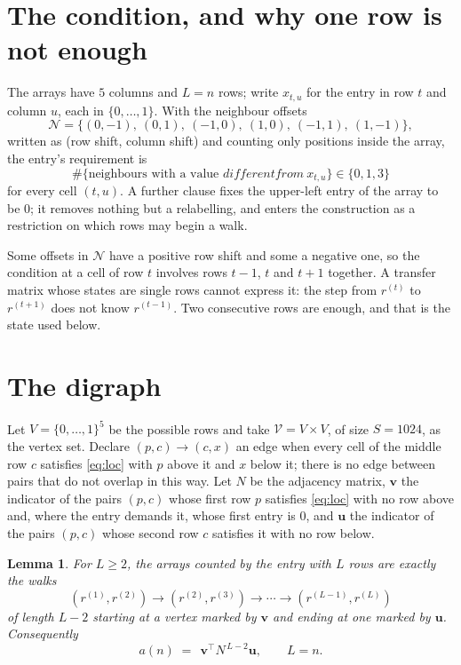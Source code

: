 \documentclass[11pt,a4paper]{article}
\theoremstyle{plain}
\newtheorem{lemma}[theorem]{Lemma}
\theoremstyle{definition}
\begin{document}
\section{The condition, and why one row is not enough}

The arrays have $5$ columns and $L=n$ rows; write $x_{t,u}$ for the entry in
row $t$ and column $u$, each in $\{0,\dots,1\}$. With the neighbour offsets
\[
\mathcal N=\{(0,-1),\ (0,1),\ (-1,0),\ (1,0),\ (-1,1),\ (1,-1)\},
\]
written as (row shift, column shift) and counting only positions inside the array, the
entry's requirement is
\begin{equation}\label{eq:loc}
\#\{\text{neighbours with a value }different from\ x_{t,u}\}\in\{0,1,3\}
\end{equation}
for every cell $(t,u)$. A further clause fixes the upper-left entry of the array to be $0$; it removes nothing but a relabelling, and enters the construction as a restriction on which rows may begin a walk.

Some offsets in $\mathcal N$ have a positive row shift and some a negative one, so the
condition at a cell of row $t$ involves rows $t-1$, $t$ and $t+1$ together. A transfer
matrix whose states are single rows cannot express it: the step from $r^{(t)}$ to
$r^{(t+1)}$ does not know $r^{(t-1)}$. Two consecutive rows are enough, and that is
the state used below.

\section{The digraph}

Let $V=\{0,\dots,1\}^{5}$ be the possible rows and take
$\mathcal V=V\times V$, of size $S=1024$, as the vertex set. Declare $(p,c)\to(c,x)$ an edge
when every cell of the middle row $c$ satisfies \eqref{eq:loc} with $p$ above it and $x$
below it; there is no edge between pairs that do not overlap in this way. Let $N$ be the
adjacency matrix, $\mathbf{v}$ the indicator of the pairs $(p,c)$ whose first row $p$
satisfies \eqref{eq:loc} with no row above and, where the entry demands it, whose first entry is $0$, and $\mathbf{u}$ the indicator of
the pairs $(p,c)$ whose second row $c$ satisfies it with no row below.

\begin{lemma}\label{lem:walk}
For $L\ge2$, the arrays counted by the entry with $L$ rows are exactly the walks
\[
(r^{(1)},r^{(2)})\to(r^{(2)},r^{(3)})\to\cdots\to(r^{(L-1)},r^{(L)})
\]
of length $L-2$ starting at a vertex marked by $\mathbf{v}$ and ending at one marked by
$\mathbf{u}$. Consequently
\[
a(n)\;=\;\,\mathbf{v}^{\!\top}N^{\,L-2}\mathbf{u},\qquad L=n .
\]
\end{lemma}
\end{document}
